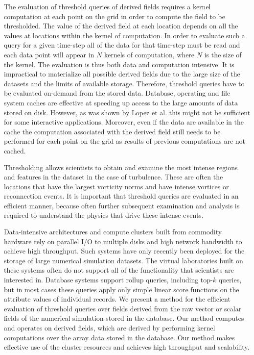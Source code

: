 \documentclass{sig-alternate}
\begin{document}
The evaluation of threshold queries of derived fields requires a kernel computation at each point on the grid in order to compute the field to be thresholded.
The value of the derived field at each location depends on all the values at locations within the kernel of computation. 
In order to evaluate such a query for a given time-step all of the data for that time-step must be read and each data point 
will appear in $N$ kernels of computation, where $N$ is the size of the kernel. The evaluation is thus both data and computation intensive.
It is impractical to materialize all possible derived fields due to the large size of the datasets and the limits of available storage. Therefore, threshold 
queries have to be evaluated on-demand from the stored data.
Database, operating and file system caches are effective at speeding up access to the large amounts of data stored on disk. However, as was
shown by Lopez et al. \cite{Lopez} this might not be sufficient for some interactive applications. Moreover, even if the data are available in the cache the
computation associated with the derived field still needs to be performed for each point on the grid as results of previous computations are not cached. 

Thresholding allows scientists to obtain and examine the most intense regions and features in the dataset in the case of turbulence. 
These are often the locations that have the largest vorticity norms and have intense vortices or reconnection events. 
It is important that threshold queries are evaluated in an efficient manner, because often further subsequent examination
and analysis is required to understand the physics that drive these intense events. 

Data-intensive architectures and compute clusters built from commodity hardware rely on parallel I/O to multiple disks and high network bandwidth
to achieve high throughput. Such systems have only recently been deployed for the storage of large numerical simulation 
datasets. The virtual laboratories built on these systems often do not support
all of the functionality that scientists are interested in. Database systems support rollup queries, including top-$k$ queries, but in most cases these
queries apply only simple linear score functions on the attribute values of individual records. 
We present a method for the efficient evaluation of threshold queries over fields derived from the raw vector or scalar fields of the numerical simulation 
stored in the database. Our method computes and operates on derived fields, which are derived by performing kernel computations over the array data 
stored in the database.
Our method makes effective use of the cluster resources and achieves high throughput and scalability. 
\end{document}
